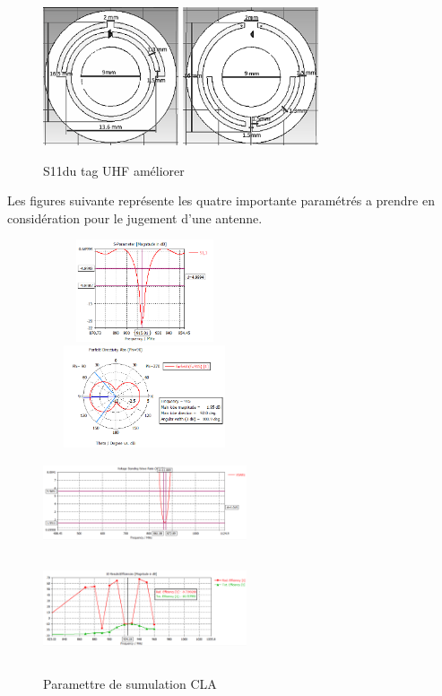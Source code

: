 \documentclass[11pt, a4paper, twoside]{book}
\begin{document}
\begin{figure}[H]
\centering
\includegraphics[width=4cm]{front11}
\includegraphics[width=4cm]{back22}
\caption{S11du tag UHF améliorer }
\end{figure}

Les figures suivante représente les quatre importante paramétrés a prendre en considération pour le jugement d'une antenne.

\begin{figure}[h]
\centering
\includegraphics[width=6cm,height=3cm]{uses11}
\includegraphics[width=6cm,height=3cm]{usefar}
\includegraphics[width=6cm,height=3cm]{claaavswr}
\includegraphics[width=6cm,height=3cm]{useeff}
\caption{Paramettre de sumulation CLA}
\end{figure} 
\end{document}
